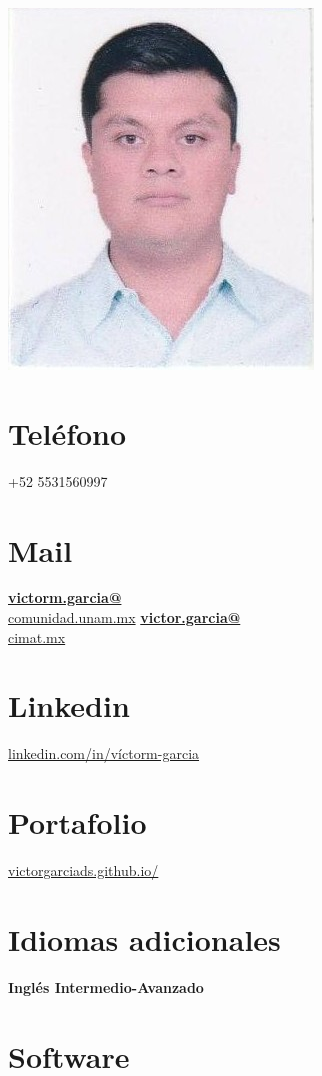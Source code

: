 \documentclass[]{friggeri-cv}
\begin{document}
\begin{aside}
  \includegraphics[scale=0.268]{img/foto2.png}
  \section{Teléfono}
    +52 5531560997
  \section{Mail}
    \href{mailto:victorm.garcia@comunidad.unam.mx}{\textbf{victorm.garcia@}\\comunidad.unam.mx}
    \href{mailto:victor.garcia@cimat.mx}{\textbf{victor.garcia@}\\cimat.mx}
    \section{Linkedin}
    \href{linkedin.com/in/víctorm-garcia}{linkedin.com/in/víctorm-garcia}
    \section{Portafolio}
    \href{victorgarciads.github.io/}{victorgarciads.github.io/}
     \section{Idiomas adicionales}
    \textbf{Inglés Intermedio-Avanzado}
  \section{Software}
   \vspace{3mm}

\end{aside}
\end{document}

